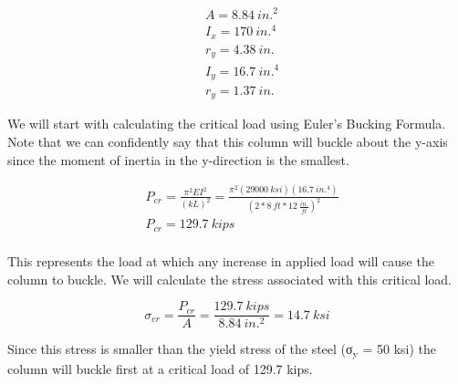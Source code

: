 \documentclass[
  letterpaper,
  DIV=11,
  numbers=noendperiod]{scrreprt}
\theoremstyle{definition}
\theoremstyle{remark}
\begin{document}
\begin{tcolorbox}
\begin{tcolorbox}
\[
\begin{aligned}
& A=8.84{~in.}^2 \\
& I_x=170{~in.}^4 \\
& r_y=4.38{~in.} \\
& I_y=16.7{~in.}^4 \\
& r_y=1.37{~in.}
\end{aligned}
\]

We will start with calculating the critical load using Euler's Bucking
Formula. Note that we can confidently say that this column will buckle
about the y-axis since the moment of inertia in the y-direction is the
smallest.

\[
\begin{aligned}
& P_{cr}=\frac{\pi^2 E I^2}{(k L)^2}=\frac{\pi^2(29000{~ksi})(16.7{~in.^4})}{\left(2*8{~ft}*12~\frac{in.}{ft}\right)^2} \\
& P_{c r}=129.7{~kips} \\
&
\end{aligned}
\]

This represents the load at which any increase in applied load will
cause the column to buckle. We will calculate the stress associated with
this critical load.

\[
\sigma_{c r}=\frac{P_{cr}}{A}=\frac{129.7{~kips}}{8.84{~in.^2}}=14.7{~ksi}
\]

Since this stress is smaller than the yield stress of the steel
(σ\textsubscript{y} = 50 ksi) the column will buckle first at a critical
load of 129.7 kips.

\end{tcolorbox}

\end{tcolorbox}
\end{document}
